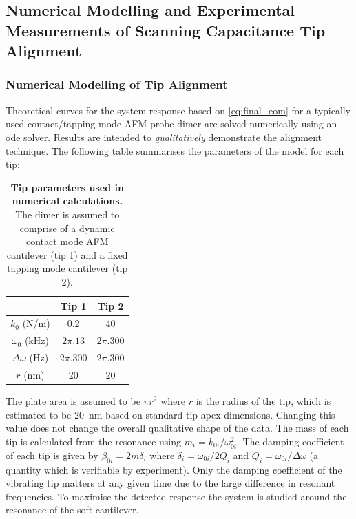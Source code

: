 \documentclass{article}
\begin{document}
\subsection{Numerical Modelling and Experimental Measurements of Scanning Capacitance Tip Alignment}

\subsubsection{Numerical Modelling of Tip Alignment}

Theoretical curves for the system response based on \eqref{eq:final_eom} for a typically used contact/tapping mode AFM probe dimer are solved numerically using an \gls{ode} solver. Results are intended to \textit{qualitatively} demonstrate the alignment technique.
The following table summarises the parameters of the model for each tip:
\begin{table}[H]
\begin{center}
\begin{tabular}{c | c | c}
\hline
& \textbf{Tip 1} & \textbf{Tip 2} \\
\hline                 
$k_0$ (N/m) & 0.2 & 40 \\
$\omega_0$ (kHz) & $2\pi.13$ & $2\pi.300$ \\
$\Delta\omega$ (Hz) & $2\pi.300$ & $2\pi.300$ \\
$r$ (nm) & 20 & 20 \\
\hline 
\end{tabular}
\end{center}
\caption[Tip parameters used in numerical calculations]{\textbf{Tip parameters used in numerical calculations.} The dimer is assumed to comprise of a dynamic contact mode AFM cantilever (tip 1) and a fixed tapping mode cantilever (tip 2).}
\vspace{-10pt}
\end{table}
The plate area is assumed to be $\pi r^2$ where $r$ is the radius of the tip, which is estimated to be \SI{20}{nm} based on standard tip apex dimensions. Changing this value does not change the overall qualitative shape of the data. The mass of each tip is calculated from the resonance using $m_i = k_{0i}/\omega_{0i}^2$. The damping coefficient of each tip is given by $\beta_{0i} = 2m\delta_i$ where $\delta_i = \omega_{0i}/2Q_i$ and $Q_i = \omega_{0i}/\Delta\omega$ (a quantity which is verifiable by experiment). Only the damping coefficient of the vibrating tip matters at any given time due to the large difference in resonant frequencies. To maximise the detected response the system is studied around the resonance of the soft cantilever.
\end{document}
